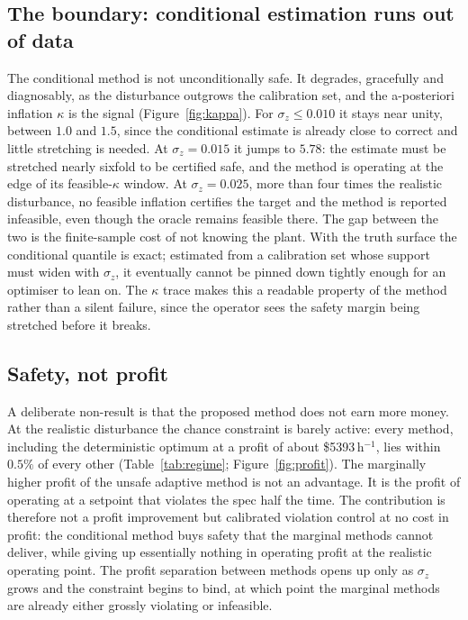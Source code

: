 \subsection{The boundary: conditional estimation runs out of data}
\label{sec:results-boundary}

The conditional method is not unconditionally safe. It degrades, gracefully and diagnosably, as
the disturbance outgrows the calibration set, and the a-posteriori inflation $\kappa$ is the
signal (Figure~\ref{fig:kappa}). For $\sigma_z\le0.010$ it stays near unity, between $1.0$ and
$1.5$, since the conditional estimate is already close to correct and little stretching is
needed. At $\sigma_z=0.015$ it jumps to $5.78$: the estimate must be stretched nearly sixfold to
be certified safe, and the method is operating at the edge of its feasible-$\kappa$ window. At
$\sigma_z=0.025$, more than four times the realistic disturbance, no feasible inflation certifies
the target and the method is reported infeasible, even though the oracle remains feasible there.
The gap between the two is the finite-sample cost of not knowing the plant. With the truth
surface the conditional quantile is exact; estimated from a calibration set whose support must
widen with $\sigma_z$, it eventually cannot be pinned down tightly enough for an optimiser to
lean on. The $\kappa$ trace makes this a readable property of the method rather than a silent
failure, since the operator sees the safety margin being stretched before it breaks.

\subsection{Safety, not profit}
\label{sec:results-profit}

A deliberate non-result is that the proposed method does not earn more money. At the realistic
disturbance the chance constraint is barely active: every method, including the deterministic
optimum at a profit of about \$5393\,h$^{-1}$, lies within $0.5\%$ of every other
(Table~\ref{tab:regime}; Figure~\ref{fig:profit}). The marginally higher profit of the unsafe
adaptive method is not an advantage. It is the profit of operating at a setpoint that violates
the spec half the time. The contribution is therefore not a profit improvement but calibrated
violation control at no cost in profit: the conditional method buys safety that the marginal
methods cannot deliver, while giving up essentially nothing in operating profit at the realistic
operating point. The profit separation between methods opens up only as $\sigma_z$ grows and the
constraint begins to bind, at which point the marginal methods are already either grossly
violating or infeasible.

